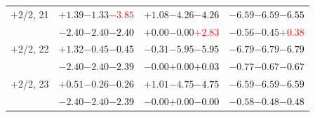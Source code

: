 \documentclass[compress]{beamer}
\begin{document}
\begin{frame}
\begin{tabular}{r | c | c | c}
$+$2/2, 21 & $+1.39$\hspace{0.1 cm}$-1.33$\hspace{0.1 cm}\textcolor{red}{$-3.85$} & $+1.08$\hspace{0.1 cm}$-4.26$\hspace{0.1 cm}\textcolor{black}{$-4.26$} & $-6.59$\hspace{0.1 cm}$-6.59$\hspace{0.1 cm}\textcolor{black}{$-6.55$} \\
           & $-2.40$\hspace{0.1 cm}$-2.40$\hspace{0.1 cm}\textcolor{black}{$-2.40$} & $+0.00$\hspace{0.1 cm}$-0.00$\hspace{0.1 cm}\textcolor{red}{$+2.83$} & $-0.56$\hspace{0.1 cm}$-0.45$\hspace{0.1 cm}\textcolor{red}{$+0.38$} \\
$+$2/2, 22 & $+1.32$\hspace{0.1 cm}$-0.45$\hspace{0.1 cm}\textcolor{black}{$-0.45$} & $-0.31$\hspace{0.1 cm}$-5.95$\hspace{0.1 cm}\textcolor{black}{$-5.95$} & $-6.79$\hspace{0.1 cm}$-6.79$\hspace{0.1 cm}\textcolor{black}{$-6.79$} \\
           & $-2.40$\hspace{0.1 cm}$-2.40$\hspace{0.1 cm}\textcolor{black}{$-2.39$} & $-0.00$\hspace{0.1 cm}$+0.00$\hspace{0.1 cm}\textcolor{black}{$+0.03$} & $-0.77$\hspace{0.1 cm}$-0.67$\hspace{0.1 cm}\textcolor{black}{$-0.67$} \\
$+$2/2, 23 & $+0.51$\hspace{0.1 cm}$-0.26$\hspace{0.1 cm}\textcolor{black}{$-0.26$} & $+1.01$\hspace{0.1 cm}$-4.75$\hspace{0.1 cm}\textcolor{black}{$-4.75$} & $-6.59$\hspace{0.1 cm}$-6.59$\hspace{0.1 cm}\textcolor{black}{$-6.59$} \\
           & $-2.40$\hspace{0.1 cm}$-2.40$\hspace{0.1 cm}\textcolor{black}{$-2.39$} & $-0.00$\hspace{0.1 cm}$+0.00$\hspace{0.1 cm}\textcolor{black}{$-0.00$} & $-0.58$\hspace{0.1 cm}$-0.48$\hspace{0.1 cm}\textcolor{black}{$-0.48$} \\

\end{tabular}
\end{frame}
\end{document}
